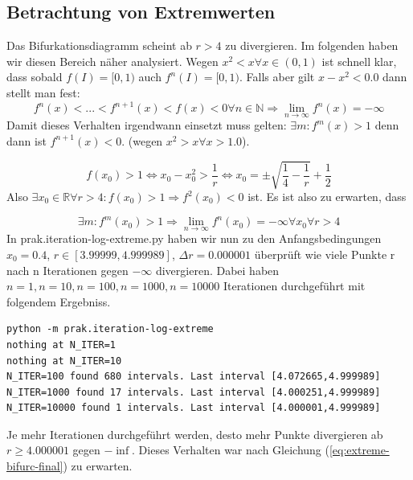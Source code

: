 \documentclass{scrartcl}
\begin{document}
\subsection{Betrachtung von Extremwerten}
Das Bifurkationsdiagramm scheint ab $r>4$ zu divergieren. Im folgenden haben wir diesen Bereich näher analysiert. 
Wegen  $x^2 < x \forall x \in (0,1)$ ist schnell klar, dass sobald $f(I) = [0,1)$ auch $f^n(I) = [0, 1)$. 
Falls aber gilt $x-x^2 < 0.0$ dann stellt man fest:
\begin{equation}
f^n(x) < ... < f^{n+1}(x) < f(x) < 0 \forall n \in \mathbb{N} \Rightarrow \lim_{n \rightarrow \infty} f^n(x) = -\infty
\end{equation}
Damit dieses Verhalten irgendwann einsetzt muss gelten: $\exists m: f^m(x) > 1$ denn dann ist $f^{n+1}(x) < 0.$ (wegen $x^2 > x \forall x > 1.0$). 

\begin{equation}
f(x_0) > 1 \iff x_0-x_0^2 > \frac{1}{r} \iff x_0 = \pm \sqrt{\frac{1}{4}-\frac{1}{r}} + \frac{1}{2}
\end{equation}
Also $\exists x_0 \in \mathbb{R} \forall r > 4: f(x_0) > 1 \Rightarrow f^2(x_0) < 0$ ist. Es ist also zu erwarten, dass 

\begin{equation}
\exists m : f^m(x_0) > 1 \Rightarrow
\lim_{n \rightarrow \infty} f^n(x_0) = -\infty \forall x_0 \forall r > 4
\label{eq:extreme-bifurc-final}
\end{equation}
In prak.iteration-log-extreme.py haben wir nun zu den Anfangsbedingungen $x_0=0.4$, $r \in [3.99999, 4.999989]$, $\Delta r = 0.000001$ überprüft wie viele Punkte r nach n Iterationen gegen $-\infty$ divergieren. Dabei haben $n=1, n=10, n=100, n=1000, n=10000$ Iterationen durchgeführt mit folgendem Ergebniss.

\begin{lstlisting}
python -m prak.iteration-log-extreme
nothing at N_ITER=1
nothing at N_ITER=10
N_ITER=100 found 680 intervals. Last interval [4.072665,4.999989]
N_ITER=1000 found 17 intervals. Last interval [4.000251,4.999989]
N_ITER=10000 found 1 intervals. Last interval [4.000001,4.999989]
\end{lstlisting}

Je mehr Iterationen durchgeführt werden, desto mehr Punkte divergieren ab $r \geq 4.000001$ gegen $-\inf$. Dieses Verhalten war nach Gleichung (\ref{eq:extreme-bifurc-final}) zu erwarten. 
\end{document}
